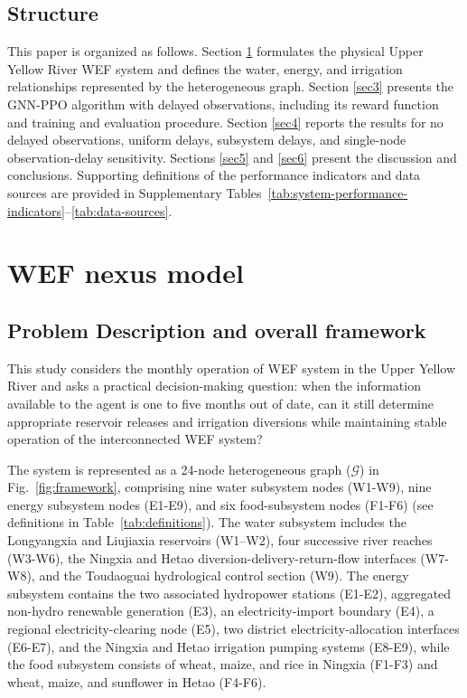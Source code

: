 \documentclass [a4paper,fleqn] {cas-dc}
\begin{document}
\subsection{Structure} \label{sec13}
This paper is organized as follows. Section \ref{sec2} formulates the physical Upper Yellow River WEF system and defines the water, energy, and irrigation relationships represented by the heterogeneous graph. Section \ref{sec3} presents the GNN-PPO algorithm with delayed observations, including its reward function and training and evaluation procedure. Section \ref{sec4} reports the results for no delayed observations, uniform delays, subsystem delays, and single-node observation-delay sensitivity. Sections \ref{sec5} and \ref{sec6} present the discussion and conclusions. Supporting definitions of the performance indicators and data sources are provided in Supplementary Tables~\ref{tab:system-performance-indicators}--\ref{tab:data-sources}.



\section{WEF nexus model} \label{sec2}

\subsection{Problem Description and overall framework}

\label{sec21}
This study considers the monthly operation of WEF system in the Upper Yellow River and asks a practical decision-making question: when the information available to the agent is one to five months out of date, can it still determine appropriate reservoir releases and irrigation diversions while maintaining stable operation of the interconnected WEF system? 

The system is represented as a 24-node heterogeneous graph ($\mathcal{G}$) in Fig.~\ref{fig:framework}, comprising nine water subsystem nodes (W1-W9), nine energy subsystem nodes (E1-E9), and six food-subsystem nodes (F1-F6) (see definitions in Table~\ref{tab:definitions}). The water subsystem includes the Longyangxia and Liujiaxia reservoirs (W1--W2), four successive river reaches (W3-W6), the Ningxia and Hetao diversion-delivery-return-flow interfaces (W7-W8), and the Toudaoguai hydrological control section (W9). The energy subsystem contains the two associated hydropower stations (E1-E2), aggregated non-hydro renewable generation (E3), an electricity-import boundary (E4), a regional electricity-clearing node (E5), two district electricity-allocation interfaces (E6-E7), and the Ningxia and Hetao irrigation pumping systems (E8-E9), while the food subsystem consists of wheat, maize, and rice in Ningxia (F1-F3) and wheat, maize, and sunflower in Hetao (F4-F6).
\end{document}
